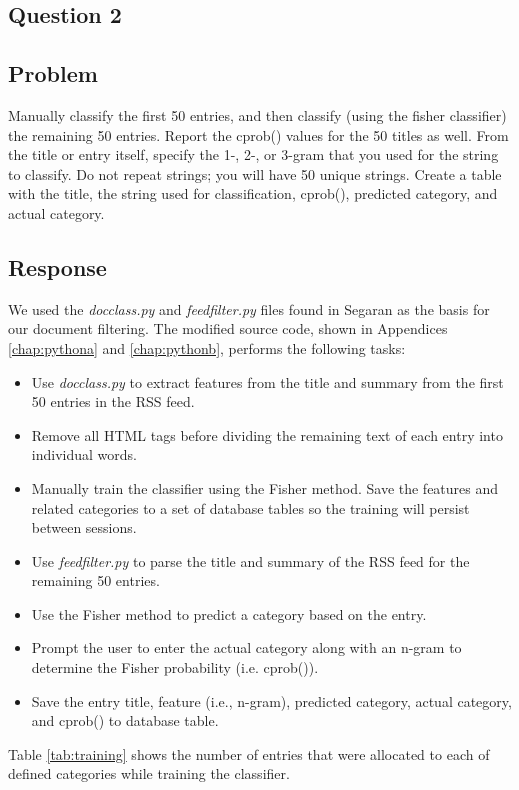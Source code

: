 \documentclass[letterpaper,11pt]{report}
\begin{document}
\begin{savenotes}
\section{Question 2}
\subsection{Problem}Manually classify the first 50 entries, and then classify (using the fisher classifier) the remaining 50 entries. Report the cprob() values for the 50 titles as well.  From the title or entry itself, specify the 1-, 2-, or 3-gram that you used for the string to classify.  Do not repeat strings; you will have 50 unique strings. Create a table with the title, the string used for classification, cprob(), predicted category, and actual category.
\subsection{Response}We used the \emph{docclass.py} and \emph{feedfilter.py} files found in Segaran \cite{segaran2007programming} as the basis for our document filtering. The modified source code, shown in Appendices \ref{chap:pythona} and \ref{chap:pythonb}, performs the following tasks:

\begin{itemize}
\item Use \emph{docclass.py} to extract features from the title and summary from the first 50 entries in the RSS feed. 
\item Remove all HTML tags before dividing the remaining text of each entry into individual words.
\item Manually train the classifier using the Fisher method. Save the features and related categories to a set of database tables so the training will persist between sessions.
\item Use \emph{feedfilter.py} to parse the title and summary of the RSS feed for the remaining 50 entries.
\item Use the Fisher method to predict a category based on the entry.
\item Prompt the user to enter the actual category along with an n-gram to determine the Fisher probability (i.e. cprob()).
\item Save the entry title, feature (i.e., n-gram), predicted category, actual category, and cprob() to database table.
\end{itemize}

Table \ref{tab:training} shows the number of entries that were allocated to each of defined categories while training the classifier.


\end{savenotes}
\end{document}

